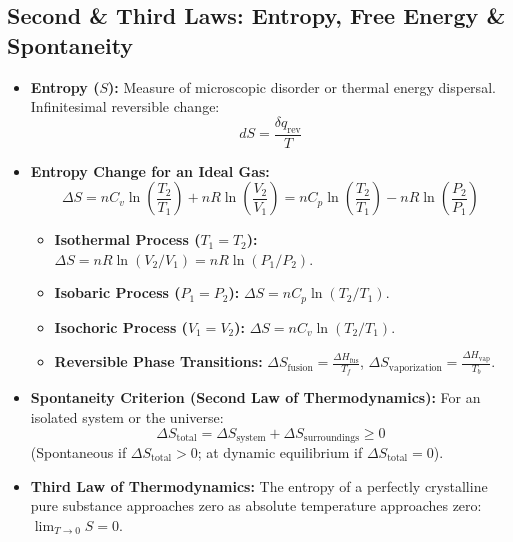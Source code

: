 \documentclass[10pt,twoside,openright]{book}
\begin{document}
\subsection{Second \& Third Laws: Entropy, Free Energy \& Spontaneity}
\begin{itemize}
  \item \textbf{Entropy ($S$):} Measure of microscopic disorder or thermal energy dispersal. Infinitesimal reversible change:
  \begin{equation}
    dS = \frac{\delta q_{\text{rev}}}{T}
  \end{equation}
  \item \textbf{Entropy Change for an Ideal Gas:}
  \begin{equation}
    \Delta S = n C_v \ln\left(\frac{T_2}{T_1}\right) + n R \ln\left(\frac{V_2}{V_1}\right) = n C_p \ln\left(\frac{T_2}{T_1}\right) - n R \ln\left(\frac{P_2}{P_1}\right)
  \end{equation}
  \begin{itemize}
    \item \textbf{Isothermal Process ($T_1 = T_2$):} $\Delta S = n R \ln(V_2 / V_1) = n R \ln(P_1 / P_2)$.
    \item \textbf{Isobaric Process ($P_1 = P_2$):} $\Delta S = n C_p \ln(T_2 / T_1)$.
    \item \textbf{Isochoric Process ($V_1 = V_2$):} $\Delta S = n C_v \ln(T_2 / T_1)$.
    \item \textbf{Reversible Phase Transitions:} $\Delta S_{\text{fusion}} = \frac{\Delta H_{\text{fus}}}{T_f}$, $\Delta S_{\text{vaporization}} = \frac{\Delta H_{\text{vap}}}{T_b}$.
  \end{itemize}
  \item \textbf{Spontaneity Criterion (Second Law of Thermodynamics):} For an isolated system or the universe:
  \begin{equation}
    \Delta S_{\text{total}} = \Delta S_{\text{system}} + \Delta S_{\text{surroundings}} \ge 0
  \end{equation}
  (Spontaneous if $\Delta S_{\text{total}} > 0$; at dynamic equilibrium if $\Delta S_{\text{total}} = 0$).
  \item \textbf{Third Law of Thermodynamics:} The entropy of a perfectly crystalline pure substance approaches zero as absolute temperature approaches zero: $\lim_{T \to 0} S = 0$.
\end{itemize}
\end{document}
